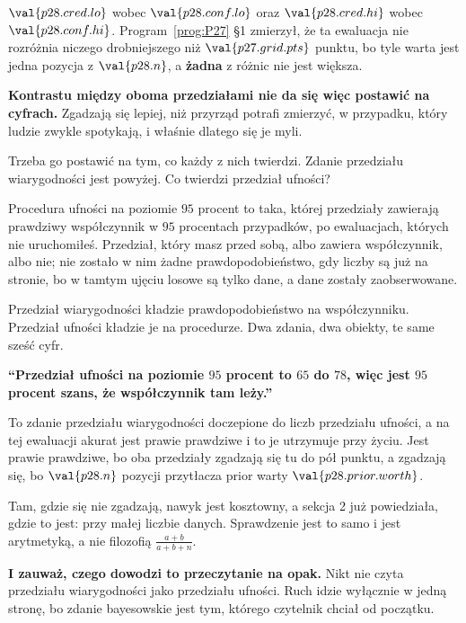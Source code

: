 \begin{fr}

$\val{p28.cred.lo}$ wobec $\val{p28.conf.lo}$ oraz $\val{p28.cred.hi}$
wobec $\val{p28.conf.hi}$. Program~\ref{prog:P27} §1 zmierzył, że ta
ewaluacja nie rozróżnia niczego drobniejszego niż $\val{p27.grid.pts}$ punktu,
bo tyle warta jest jedna pozycja z $\val{p28.n}$, a \textbf{żadna}
z różnic nie jest większa.

\textbf{Kontrastu między oboma przedziałami nie da się więc postawić na
cyfrach.} Zgadzają się lepiej, niż przyrząd potrafi zmierzyć, w przypadku,
który ludzie zwykle spotykają, i właśnie dlatego się je myli.

Trzeba go postawić na tym, co każdy z nich twierdzi. Zdanie przedziału
wiarygodności jest powyżej. Co twierdzi przedział ufności?
\dotline
\nextframe
\end{fr}

\begin{fr}

Procedura ufności na poziomie $95$ procent to taka, której przedziały
zawierają prawdziwy współczynnik w $95$ procentach przypadków, po ewaluacjach,
których nie uruchomiłeś. Przedział, który masz przed sobą, albo zawiera
współczynnik, albo nie; nie zostało w nim żadne prawdopodobieństwo, gdy liczby
są już na stronie, bo w tamtym ujęciu losowe są tylko dane, a dane zostały
zaobserwowane.

Przedział wiarygodności kładzie prawdopodobieństwo na współczynniku. Przedział
ufności kładzie je na procedurze. Dwa zdania, dwa obiekty, te same sześć cyfr.

\end{fr}

\begin{fr}
\begin{trapbox}
\textbf{\enquote{Przedział ufności na poziomie $95$ procent to $65$ do $78$,
więc jest $95$ procent szans, że współczynnik tam leży.}}

To zdanie przedziału wiarygodności doczepione do liczb przedziału ufności, a
na tej ewaluacji akurat jest prawie prawdziwe \dash{} i to je utrzymuje przy
życiu. Jest prawie prawdziwe, bo oba przedziały zgadzają się tu do pół punktu,
a zgadzają się, bo $\val{p28.n}$ pozycji przytłacza prior warty
$\val{p28.prior.worth}$.

Tam, gdzie się nie zgadzają, nawyk jest kosztowny, a sekcja 2 już powiedziała,
gdzie to jest: przy małej liczbie danych. Sprawdzenie jest to samo i jest
arytmetyką, a nie filozofią \dash{} $\frac{a+b}{a+b+n}$.

\textbf{I zauważ, czego dowodzi to przeczytanie na opak.} Nikt nie czyta
przedziału wiarygodności jako przedziału ufności. Ruch idzie wyłącznie w jedną
stronę, bo zdanie bayesowskie jest tym, którego czytelnik chciał od początku.
\end{trapbox}
\end{fr}

